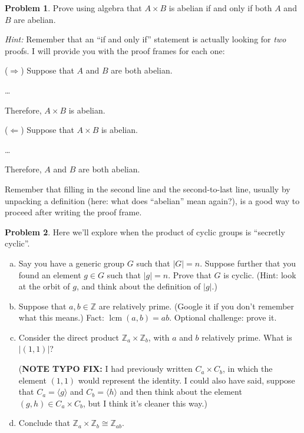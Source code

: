 \documentclass[12pt]{article}
\theoremstyle{definition} %
\newtheorem{problem}{Problem}
\newcommand{\Alert}[1]{\textcolor{xRed}{#1}}
\newcommand{\Z}{\mathbb{Z}}
\def\<{\langle}
\def\>{\rangle}
\DeclareMathOperator{\lcm}{lcm}
\begin{document}
\begin{problem}
    Prove using algebra that $A\times B$ is abelian \Alert{if and only if} both $A$ and $B$ are abelian.

    \textit{Hint:} Remember that an \Alert{``if and only if''} statement is actually looking for \textit{two} proofs. I will provide you with the proof frames for each one:
    \begin{multicols}{2}
        ($\Rightarrow$) Suppose that $A$ and $B$ are both abelian.

        \ldots

        Therefore, $A\times B$ is abelian.

        ($\Leftarrow$) Suppose that $A\times B$ is abelian.

        \ldots

        Therefore, $A$ and $B$ are both abelian.
    \end{multicols}

    Remember that filling in the second line and the second-to-last line, usually by unpacking a definition (here: what does ``abelian'' mean again?), is a good way to proceed after writing the proof frame.
    
\end{problem}

\begin{problem}
    Here we'll explore when the product of cyclic groups is ``secretly cyclic''.
    \begin{enumerate}[(a)]
        \item Say you have a generic group $G$ such that $|G| = n$. Suppose further that you found an element $g\in G$ such that $|g| = n$. Prove that $G$ is cyclic. (Hint: look at the orbit of $g$, and think about the definition of $|g|$.)

        \item Suppose that $a, b \in \Z$ are relatively prime. (Google it if you don't remember what this means.) Fact: $\lcm(a, b) = ab.$ Optional challenge: prove it.

        \item Consider the direct product $\Z_a \times \Z_b$, with $a$ and $b$ relatively prime. What is $|(1,1)|$?

        (\textbf{\Alert{NOTE TYPO FIX:}} I had previously written $C_a \times C_b$, in which the element $(1,1)$ would represent the identity. I could also have said, suppose that $C_a = \<g\>$ and $C_b = \<h\>$ and then think about the element $(g, h)\in C_a \times C_b$, but I think it's cleaner this way.)

        \item Conclude that $\Z_a \times \Z_b \cong \Z_{ab}.$
    \end{enumerate}
\end{problem}
\end{document}
